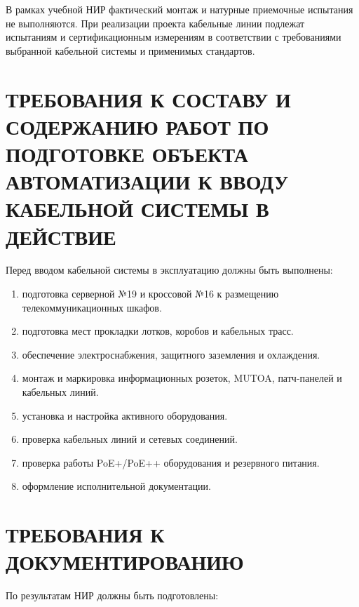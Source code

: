 \documentclass{bmstu}
\begin{document}
\begin{appendices}
В рамках учебной НИР фактический монтаж и натурные приемочные испытания не выполняются. При реализации проекта кабельные линии подлежат испытаниям и сертификационным измерениям в соответствии с требованиями выбранной кабельной системы и применимых стандартов.


\section{ТРЕБОВАНИЯ К СОСТАВУ И СОДЕРЖАНИЮ РАБОТ ПО ПОДГОТОВКЕ ОБЪЕКТА АВТОМАТИЗАЦИИ К ВВОДУ КАБЕЛЬНОЙ СИСТЕМЫ В ДЕЙСТВИЕ}

Перед вводом кабельной системы в эксплуатацию должны быть выполнены:

\begin{enumerate}[label=\asbuk*)]
    \item подготовка серверной №19 и кроссовой №16 к размещению телекоммуникационных шкафов.
    \item подготовка мест прокладки лотков, коробов и кабельных трасс.
    \item обеспечение электроснабжения, защитного заземления и охлаждения.
    \item монтаж и маркировка информационных розеток, MUTOA, патч-панелей и кабельных линий.
    \item установка и настройка активного оборудования.
    \item проверка кабельных линий и сетевых соединений.
    \item проверка работы PoE+/PoE++ оборудования и резервного питания.
    \item оформление исполнительной документации.
\end{enumerate}


\section{ТРЕБОВАНИЯ К ДОКУМЕНТИРОВАНИЮ}

По результатам НИР должны быть подготовлены:


\end{appendices}
\end{document}
